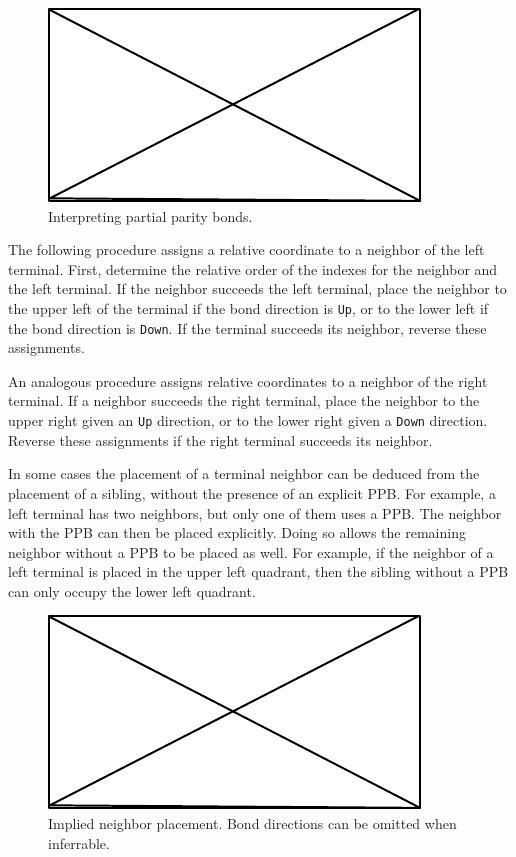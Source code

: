 \documentclass{article}
\def\ttt{\texttt}
\begin{document}
\begin{figure}
    \centering
    \includegraphics{filler}
    \caption{Interpreting partial parity bonds.}
    \label{fig:interpret-ppb}
\end{figure}

The following procedure assigns a relative coordinate to a neighbor of the left terminal. First, determine the relative order of the indexes for the neighbor and the left terminal. If the neighbor succeeds the left terminal, place the neighbor to the upper left of the terminal if the bond direction is \ttt{Up}, or to the lower left if the bond direction is \ttt{Down}. If the terminal succeeds its neighbor, reverse these assignments.

An analogous procedure assigns relative coordinates to a neighbor of the right terminal. If a neighbor succeeds the right terminal, place the neighbor to the upper right given an \ttt{Up} direction, or to the lower right given a \ttt{Down} direction. Reverse these assignments if the right terminal succeeds its neighbor.

In some cases the placement of a terminal neighbor can be deduced from the placement of a sibling, without the presence of an explicit PPB. For example, a left terminal has two neighbors, but only one of them uses a PPB. The neighbor with the PPB can then be placed explicitly. Doing so allows the remaining neighbor without a PPB to be placed as well. For example, if the neighbor of a left terminal is placed in the upper left quadrant, then the sibling without a PPB can only occupy the lower left quadrant.

\begin{figure}
    \centering
    \includegraphics{filler}
    \caption{Implied neighbor placement. Bond directions can be omitted when inferrable.}
    \label{fig:implied-neighbor-placement}
\end{figure}
\end{document}
